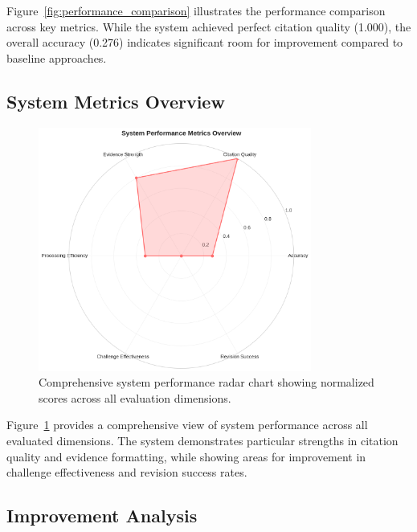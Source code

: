 \documentclass[11pt,a4paper]{article}
\begin{document}
Figure~\ref{fig:performance_comparison} illustrates the performance comparison across key metrics. While the system achieved perfect citation quality (1.000), the overall accuracy (0.276) indicates significant room for improvement compared to baseline approaches.

\subsection{System Metrics Overview}

\begin{figure}[htbp]
\centering
\includegraphics[width=0.8\textwidth]{figures/metrics_radar.png}
\caption{Comprehensive system performance radar chart showing normalized scores across all evaluation dimensions.}
\label{fig:metrics_radar}
\end{figure}

Figure~\ref{fig:metrics_radar} provides a comprehensive view of system performance across all evaluated dimensions. The system demonstrates particular strengths in citation quality and evidence formatting, while showing areas for improvement in challenge effectiveness and revision success rates.

\subsection{Improvement Analysis}
\end{document}
